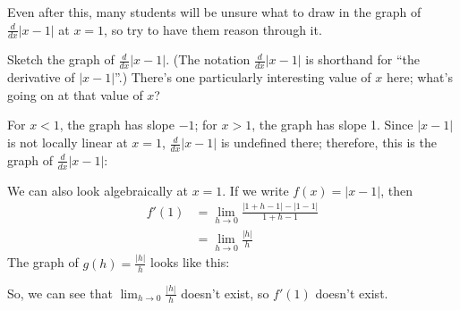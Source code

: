 \documentclass{article}
\begin{document}
\begin{enumerate}
\begin{enumerate}
{      Even after this, many students will be unsure what to draw in the graph of $\frac{d}{dx} | x - 1|$ at $x = 1$, so try to have them reason through it.}

    \begin{problem}[\vfill\newpage]
      Sketch the graph of $\displaystyle \frac{d}{dx} |x - 1|$.   (The
      notation $\displaystyle \frac{d}{dx} |x - 1|$ is shorthand for ``the
      derivative of $|x - 1|$''.)  There's one particularly interesting
      value of $x$ here; what's going on at that value of $x$?
    \end{problem}

    \begin{solution}
      For $x < 1$, the graph has slope $-1$; for $x > 1$, the graph has
      slope 1.  Since $|x - 1|$ is not locally linear at $x = 1$,
      $\frac{d}{dx} |x - 1|$ is undefined there; therefore, this is the
      graph of $\frac{d}{dx} |x - 1|$:
      \begin{center}
      \end{center}
      We can also look algebraically at $x = 1$. If we write $f(x) =
      |x - 1|$, then
      \begin{align*}
        f'(1) &= \lim_{h \rightarrow 0} \frac{ |1+h-1| - |1-1|}{1+h-1 } \\
        & = \lim_{h \rightarrow 0} \frac{ |h|}{h} 
      \end{align*}
      The graph of $g(h) = \frac{|h|}{h}$ looks like this:
      \begin{center}
      \end{center}
      So, we can see that $\displaystyle \lim_{h \rightarrow 0} \frac{
        |h|}{h}$ doesn't exist, so $f'(1)$ doesn't exist. 
    \end{solution}

  \end{enumerate}

\end{enumerate}
\end{document}
